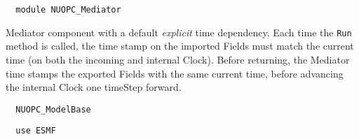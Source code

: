 
\setlength{\parskip}{0pt}
\setlength{\parindent}{0pt}
\setlength{\baselineskip}{11pt}
 
\def\bv{\begin{verbatim}}
\def\ev{\end{verbatim}}
\def\be{\begin{equation}}
\def\ee{\end{equation}}
\def\bea{\begin{eqnarray}}
\def\eea{\end{eqnarray}}
\def\bi{\begin{itemize}}
\def\ei{\end{itemize}}
\def\bn{\begin{enumerate}}
\def\en{\end{enumerate}}
\def\bd{\begin{description}}
\def\ed{\end{description}}
\def\({\left (}
\def\){\right )}
\def\[{\left [}
\def\]{\right ]}
\def\<{\left  \langle}
\def\>{\right \rangle}
\def\cI{{\cal I}}
\def\diag{\mathop{\rm diag}}
\def\tr{\mathop{\rm tr}}


\begin{verbatim}  module NUOPC_Mediator
\end{verbatim}

Mediator component with a default {\em explicit} time dependency. Each time the {\tt Run} method is called, the time stamp on the imported Fields must match the current time (on both the incoming and internal Clock). Before returning, the Mediator time stamps the exported Fields with the same current time, before advancing the internal Clock one timeStep forward.

\begin{verbatim}  NUOPC_ModelBase
\end{verbatim}

\begin{verbatim}  use ESMF
\end{verbatim}

